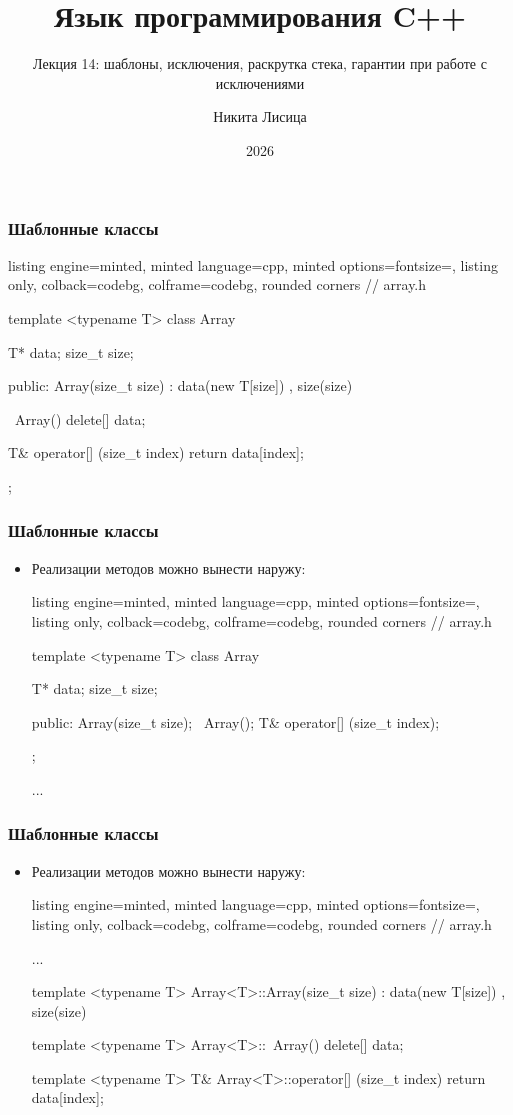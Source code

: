 \documentclass[10pt]{beamer}
\title{Язык программирования C++}
\subtitle{Лекция 14: шаблоны, исключения, раскрутка стека, гарантии при работе с исключениями}
\date{2026}
\author{Никита Лисица}
\begin{document}
\frame{\titlepage}

\begin{frame}[fragile]
\frametitle{Шаблонные классы}
\begin{itemize}
\begin{tcblisting}{listing engine=minted, minted language=cpp, minted options={fontsize=\scriptsize}, listing only, colback=codebg, colframe=codebg, rounded corners}
// array.h

template <typename T>
class Array {
  T* data;
  size_t size;

public:
  Array(size_t size)
    : data(new T[size])
    , size(size)
  {}

  ~Array() {
    delete[] data;
  }

  T& operator[] (size_t index) {
    return data[index];
  }
};
\end{tcblisting}
\end{itemize}
\end{frame}

\begin{frame}[fragile]
\frametitle{Шаблонные классы}
\begin{itemize}
\item Реализации методов можно вынести наружу:
\begin{tcblisting}{listing engine=minted, minted language=cpp, minted options={fontsize=\scriptsize}, listing only, colback=codebg, colframe=codebg, rounded corners}
// array.h

template <typename T>
class Array {
  T* data;
  size_t size;

public:
  Array(size_t size);
  ~Array();
  T& operator[] (size_t index);
};

...
\end{tcblisting}
\end{itemize}
\end{frame}

\begin{frame}[fragile]
\frametitle{Шаблонные классы}
\begin{itemize}
\item Реализации методов можно вынести наружу:
\begin{tcblisting}{listing engine=minted, minted language=cpp, minted options={fontsize=\scriptsize}, listing only, colback=codebg, colframe=codebg, rounded corners}
// array.h

...

template <typename T>
Array<T>::Array(size_t size)
  : data(new T[size])
  , size(size)
{}

template <typename T>
Array<T>::~Array() {
  delete[] data;
}

template <typename T>
T& Array<T>::operator[] (size_t index) {
  return data[index];
}
\end{tcblisting}
\end{itemize}
\end{frame}
\end{document}
